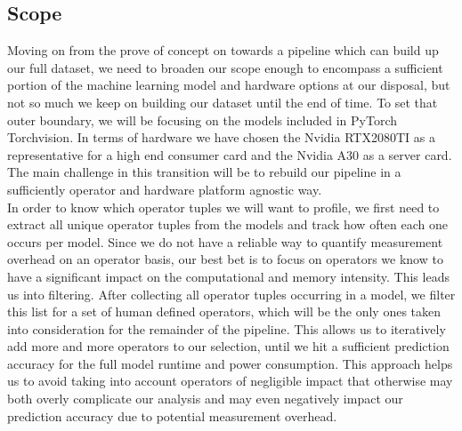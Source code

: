 \documentclass[conference]{IEEEtran}
\begin{document}
\subsection{Scope}
Moving on from the prove of concept on towards a pipeline which can build up our full dataset, we need to broaden our scope enough to encompass a sufficient portion of the machine learning model and hardware options at our disposal, but not so much we keep on building our dataset until the end of time.
To set that outer boundary, we will be focusing on the models included in PyTorch Torchvision. In terms of hardware we have chosen the Nvidia RTX2080TI as a representative for a high end consumer card and the Nvidia A30 as a server card. The main challenge in this transition will be to rebuild our pipeline in a sufficiently operator and hardware platform agnostic way. \\
In order to know which operator tuples we will want to profile, we first need to extract all unique operator tuples from the models and track how often each one occurs per model. Since we do not have a reliable way to quantify measurement overhead on an operator basis, our best bet is to focus on operators we know to have a significant impact on the computational and memory intensity. This leads us into filtering. After collecting all operator tuples occurring in a model, we filter this list for a set of human defined operators, which will be the only ones taken into consideration for the remainder of the pipeline. This allows us to iteratively add more and more operators to our selection, until we hit a sufficient prediction accuracy for the full model runtime and power consumption. This approach helps us to avoid taking into account operators of negligible impact that otherwise may both overly complicate our analysis and may even negatively impact our prediction accuracy due to potential measurement overhead. 
\end{document}
